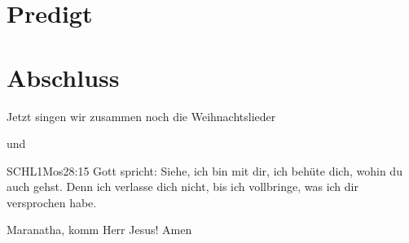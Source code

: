 \documentclass{mybib}
\begin{document}
\section{Predigt}








\section{Abschluss}

Jetzt singen wir zusammen noch die Weihnachtslieder

 und


\beten{}

\begin{bibelbox}{SCHL}{1Mos}{28:15}
    Gott spricht: Siehe, ich bin mit dir,
    ich behüte dich, wohin du auch gehst.
    Denn ich verlasse dich nicht,
    bis ich vollbringe, was ich dir versprochen habe.
\end{bibelbox}

Maranatha, komm Herr Jesus! Amen\\
\\
\end{document}
